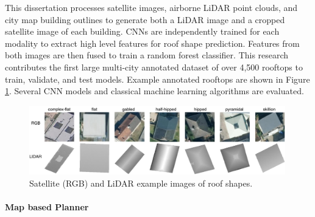 This dissertation processes satellite images, airborne LiDAR point clouds, and city map  building outlines to generate both a LiDAR image and a cropped satellite image of each building. CNNs are independently trained for each modality to extract high level features for roof shape prediction. Features from both images are then fused to train a random forest classifier. This research contributes the first large multi-city annotated dataset of over 4,500 rooftops to train, validate, and test models.  Example annotated rooftops are shown in Figure \ref{fig:ch1_rooftop_shape_examples}. Several CNN models and classical machine learning algorithms are evaluated.

\begin{figure}[t]
\centering
\includegraphics[width=0.99\textwidth]{chapter_4_roofshape/imgs/RoofShapes.pdf}
\caption{Satellite (RGB) and LiDAR example images of roof shapes.}
\label{fig:ch1_rooftop_shape_examples}
\end{figure}


\paragraph{Map based Planner}




